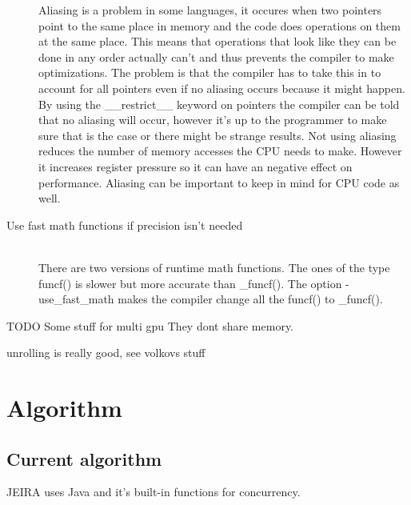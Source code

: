\documentclass[10pt,a4paper]{article}
\begin{document}
\begin{description}
  Aliasing is a problem in some languages, it occures when two pointers point to the same place in memory and the code does operations on them at the same place. This means that operations that look like they can be done in any order actually can't and thus prevents the compiler to make optimizations. The problem is that the compiler has to take this in to account for all pointers even if no aliasing occurs because it might happen. By using the \_\_restrict\_\_ keyword on pointers the compiler can be told that no aliasing will occur, however it's up to the programmer to make sure that is the case or there might be strange results. Not using aliasing reduces the number of memory accesses the CPU needs to make. However it increases register pressure so it can have an negative effect on performance.\cite{cuda} Aliasing can be important to keep in mind for CPU code as well\cite{drepper2007cpumemory}.
  \item[Use fast math functions if precision isn't needed] \hfill \\
  There are two versions of runtime math functions. The ones of the type funcf() is slower but more accurate than \_funcf(). The option -use\_fast\_math makes the compiler change all the funcf() to \_funcf().\cite{cuda_best_practice}
\end{description}

TODO
Some stuff for multi gpu
They dont share memory.

unrolling is really good, see volkovs stuff

\clearpage
\section{Algorithm}







\subsection{Current algorithm}
JEIRA uses Java and it's built-in functions for concurrency.
\end{document}
